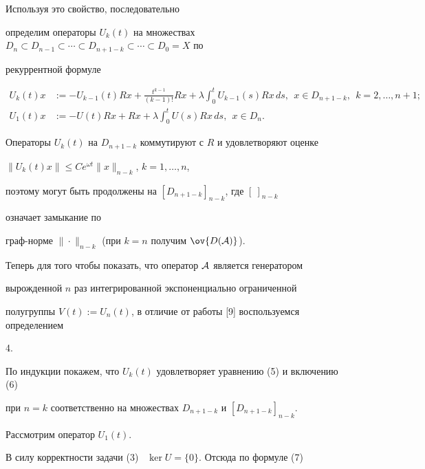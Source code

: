 \begin{pf}
Используя это свойство, последовательно 


определим операторы $U_k(t)$ на множествах $D_n\subset D_{n-1}\subset \dotsb 


\subset D_{n+1-k}\subset\dotsb\subset D_0=X$ по 


рекуррентной формуле 


\begin{equation} 


\begin{split} 


U_k(t)x&:=-U_{k-1}(t)Rx+\frac{t^{k-1}}{(k-1)!}Rx+\lambda 


\int^t_0 U_{k-1}(s)Rx\,ds,\ \ x\in D_{n+1-k},\ \ k=2,\dotsc,n+1;\\ 


% 


U_1(t)x&:=-U(t)Rx+Rx+\lambda\int^t_0 U(s)Rx\,ds,\ \ x\in D_n.


\end{split} 


\end{equation} 


 


Операторы $U_k(t)$ на $D_{n+1-k}$ коммутируют с $R$ и удовлетворяют оценке 


$\|U_k(t)x\|\le C e^{\omega t}\|x\|_{n-k}$, $k=1,\dotsc,n$, 


поэтому могут быть продолжены на $[D_{n+1-k}]_{n-k}$, где $[\ ]_{n-k}$ 


означает замыкание по 


граф-норме $\|\cdot\|_{n-k}$ (при $k=n$ получим $\ov{D(\cal A)}$). 


 


Теперь для того чтобы показать, что оператор $\cal A$ является генератором 


вырожденной $n$ раз интегрированной экспоненциально ограниченной 


полугруппы $V(t):=U_n(t)$, в отличие от работы [9] воспользуемся определением 


4. 


По индукции покажем, что $U_k(t)$ удовлетворяет уравнению (5) и включению (6) 


при $n=k$ соответственно на множествах $D_{n+1-k}$ и $[D_{n+1-k}]_{n-k}$. 


Рассмотрим оператор $U_1(t)$. 


В силу корректности задачи (3) \ $\ker U=\{0\}$. Отсюда по формуле (7) 



\end{pf}
